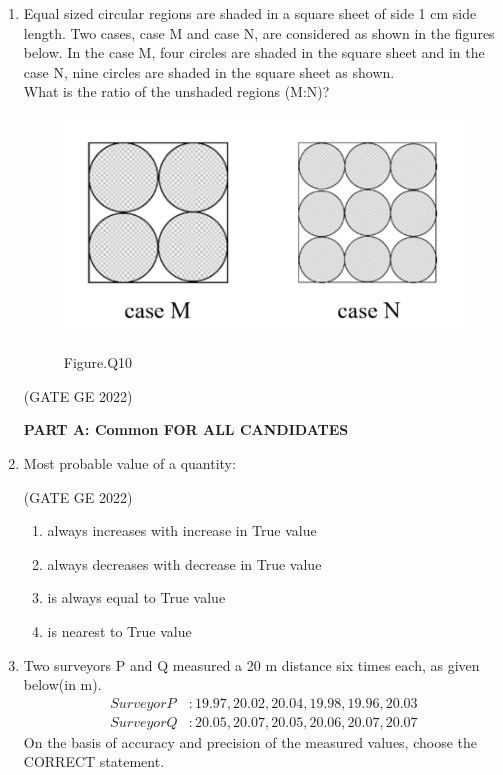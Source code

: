 \documentclass[journal,12pt,onecolumn]{IEEEtran}
\theoremstyle{remark}
\begin{document}
\begin{enumerate}
\item Equal sized circular regions are shaded in a square sheet of side 1 cm side length. Two cases, case M and case N, are considered as shown in the figures below. In the case M, four circles are shaded in the square sheet and in the case N, nine circles are shaded in the square sheet as shown. \\
What is the ratio of the unshaded regions (M:N)?
\begin{figure}[H]
    \centering
    \includegraphics[width=0.4\columnwidth]{figs/fig_10.png}
    \label{fig:question10}
    \caption*{Figure.Q10}
\end{figure}

\hfill (GATE GE 2022)

\begin{enumerate}
\end{enumerate}

\textbf{PART A: Common FOR ALL CANDIDATES}

\item Most probable value of a quantity:

\hfill (GATE GE 2022)

\begin{enumerate}
    \item always increases with increase in True value
    \item always decreases with decrease in True value
    \item is always equal to True value
    \item is nearest to True value
\end{enumerate}

\item Two surveyors P and Q measured a 20 m distance six times each, as given below(in m).
\begin{align*}
    Surveyor P &: 19.97, 20.02, 20.04, 19.98, 19.96, 20.03 \\
    Surveyor Q &: 20.05, 20.07, 20.05, 20.06, 20.07, 20.07
\end{align*}
On the basis of accuracy and precision of the measured values, choose the CORRECT statement.


\end{enumerate}
\end{document}
